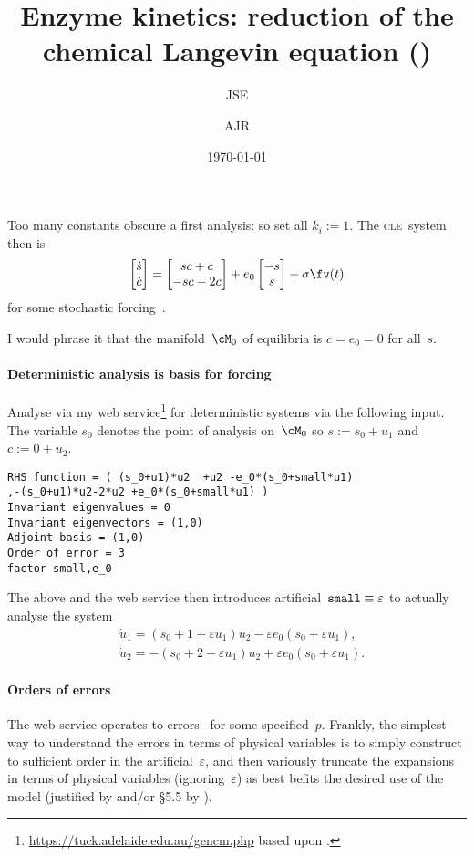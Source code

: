\documentclass[12pt,a5paper]{article}
\title{Enzyme kinetics: reduction of the chemical Langevin equation (\cle)}
\author{JSE \and AJR}
\date{\today}
\def\cle{\textsc{cle}}
\begin{document}
\maketitle

Too many constants obscure a first analysis:
so set all \(k_i:=1\).
The \cle\ system then is
\begin{equation}
\begin{bmatrix} \dot s \\ \dot  c \end{bmatrix}
=\begin{bmatrix} sc+c \\-sc-2c \end{bmatrix}
+e_0\begin{bmatrix} -s\\s \end{bmatrix}
+\sigma\fv(t) \label{eq:cle}
\end{equation}
for some stochastic forcing~\fv.

I would phrase it that the manifold~\(\cM_0\) of equilibria is \(c=e_0=0\) for all~\(s\).

\paragraph{Deterministic analysis is basis for forcing}
Analyse via my web service\footnote{\url{https://tuck.adelaide.edu.au/gencm.php} based upon \cite{Roberts96a}.} for deterministic systems via the following input.  The variable \(s_0\) denotes the point of analysis on~\(\cM_0\) so \(s:=s_0+u_1\) and \(c:=0+u_2\).
\begin{verbatim}
RHS function = ( (s_0+u1)*u2  +u2 -e_0*(s_0+small*u1)
,-(s_0+u1)*u2-2*u2 +e_0*(s_0+small*u1) )
Invariant eigenvalues = 0
Invariant eigenvectors = (1,0)
Adjoint basis = (1,0)
Order of error = 3
factor small,e_0
\end{verbatim}
The above and the web service then introduces artificial~\(\verb|small|\equiv\varepsilon\) to actually analyse the system
\begin{align*}&
\dot u_1=(s_0+1+\varepsilon u_1)u_2-\varepsilon e_0(s_0+\varepsilon u_1),
\\&
\dot u_2=-(s_0+2+\varepsilon u_1)u_2+\varepsilon e_0(s_0+\varepsilon u_1).
\end{align*}

\paragraph{Orders of errors}
The web service operates to errors~ for some specified~\(p\).
Frankly, the simplest way to understand the errors in terms of physical variables is to simply construct to sufficient order in the artificial~\(\varepsilon\), and then variously truncate the expansions in terms of physical variables (ignoring~\(\varepsilon\)) as best befits the desired use of the model (justified by \cite{Zhenquan00} and/or \S5.5 by \cite{Roberts2014a}).  
\end{document}
